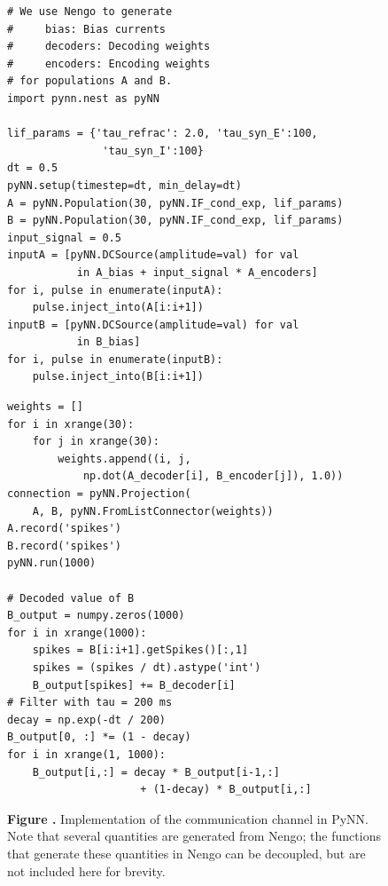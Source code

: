 \documentclass{frontiersSCNS}
\begin{document}
\begin{figure}
\begin{center}
  \begin{minipage}{.435\textwidth}
    \begin{lstlisting}[basicstyle={\footnotesize\ttfamily}]
# We use Nengo to generate
#     bias: Bias currents
#     decoders: Decoding weights
#     encoders: Encoding weights
# for populations A and B.
import pynn.nest as pyNN

lif_params = {'tau_refrac': 2.0, 'tau_syn_E':100,
               'tau_syn_I':100}
dt = 0.5
pyNN.setup(timestep=dt, min_delay=dt)
A = pyNN.Population(30, pyNN.IF_cond_exp, lif_params)
B = pyNN.Population(30, pyNN.IF_cond_exp, lif_params)
input_signal = 0.5
inputA = [pyNN.DCSource(amplitude=val) for val
           in A_bias + input_signal * A_encoders]
for i, pulse in enumerate(inputA):
    pulse.inject_into(A[i:i+1])
inputB = [pyNN.DCSource(amplitude=val) for val
           in B_bias]
for i, pulse in enumerate(inputB):
    pulse.inject_into(B[i:i+1])
    \end{lstlisting}
  \end{minipage}
  \begin{minipage}{.46\textwidth}
    \begin{lstlisting}[basicstyle={\footnotesize\ttfamily}]
weights = []
for i in xrange(30):
    for j in xrange(30):
        weights.append((i, j,
            np.dot(A_decoder[i], B_encoder[j]), 1.0))
connection = pyNN.Projection(
    A, B, pyNN.FromListConnector(weights))
A.record('spikes')
B.record('spikes')
pyNN.run(1000)

# Decoded value of B
B_output = numpy.zeros(1000)
for i in xrange(1000):
    spikes = B[i:i+1].getSpikes()[:,1]
    spikes = (spikes / dt).astype('int')
    B_output[spikes] += B_decoder[i]
# Filter with tau = 200 ms
decay = np.exp(-dt / 200)
B_output[0, :] *= (1 - decay)
for i in xrange(1, 1000):
    B_output[i,:] = decay * B_output[i-1,:]
                     + (1-decay) * B_output[i,:]
    \end{lstlisting}
  \end{minipage}
\end{center}
 \textbf{\label{fig:pynn} Figure .}{
   Implementation of the communication channel in PyNN.
   Note that several quantities are generated from Nengo;
   the functions that generate these quantities in Nengo
   can be decoupled, but are not included here for brevity.}
\end{figure}
\end{document}
